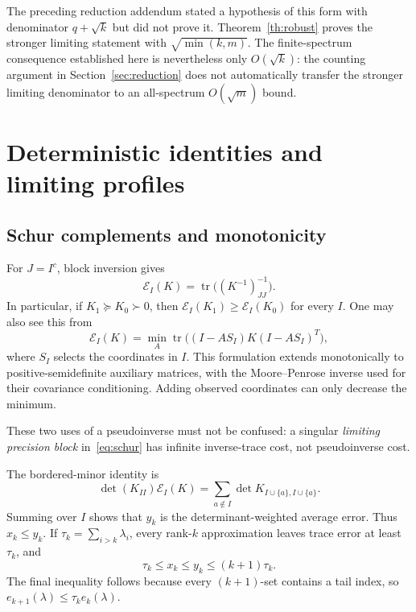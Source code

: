 \documentclass[11pt]{article}
\theoremstyle{remark}\newtheorem{remark}[theorem]{Remark}
\newcommand{\tr}{\operatorname{tr}}
\newcommand{\Err}{\mathcal E}
\begin{document}
The preceding reduction addendum stated a hypothesis of this form with denominator $q+\sqrt{k}$ but did not prove it. Theorem~\ref{th:robust} proves the stronger limiting statement with $\sqrt{\min(k,m)}$. The finite-spectrum consequence established here is nevertheless only $O(\sqrt{k})$: the counting argument in Section~\ref{sec:reduction} does not automatically transfer the stronger limiting denominator to an all-spectrum $O(\sqrt m)$ bound.

\section{Deterministic identities and limiting profiles}
\subsection{Schur complements and monotonicity}
For $J=I^c$, block inversion gives
\begin{equation}\label{eq:schur}
 \Err_I(K)=\tr\bigl((K^{-1})_{JJ}^{-1}\bigr).
\end{equation}
In particular, if $K_1\succeq K_0\succ0$, then $\Err_I(K_1)\ge\Err_I(K_0)$ for every $I$. One may also see this from
\[
 \Err_I(K)=\min_A\tr\bigl((I-A S_I)K(I-A S_I)^T\bigr),
\]
where $S_I$ selects the coordinates in $I$. This formulation extends monotonically to positive-semidefinite auxiliary matrices, with the Moore--Penrose inverse used for their covariance conditioning. Adding observed coordinates can only decrease the minimum.

These two uses of a pseudoinverse must not be confused: a singular \emph{limiting precision block} in~\eqref{eq:schur} has infinite inverse-trace cost, not pseudoinverse cost.

The bordered-minor identity is
\[
 \det(K_{II})\Err_I(K)
 =\sum_{a\notin I}\det K_{I\cup\{a\},I\cup\{a\}}.
\]
Summing over $I$ shows that $y_k$ is the determinant-weighted average error. Thus $x_k\le y_k$. If $\tau_k=\sum_{i>k}\lambda_i$, every rank-$k$ approximation leaves trace error at least $\tau_k$, and
\begin{equation}\label{eq:baseline}
 \tau_k\le x_k\le y_k\le(k+1)\tau_k.
\end{equation}
The final inequality follows because every $(k+1)$-set contains a tail index, so $e_{k+1}(\lambda)\le \tau_k e_k(\lambda)$.
\end{document}
